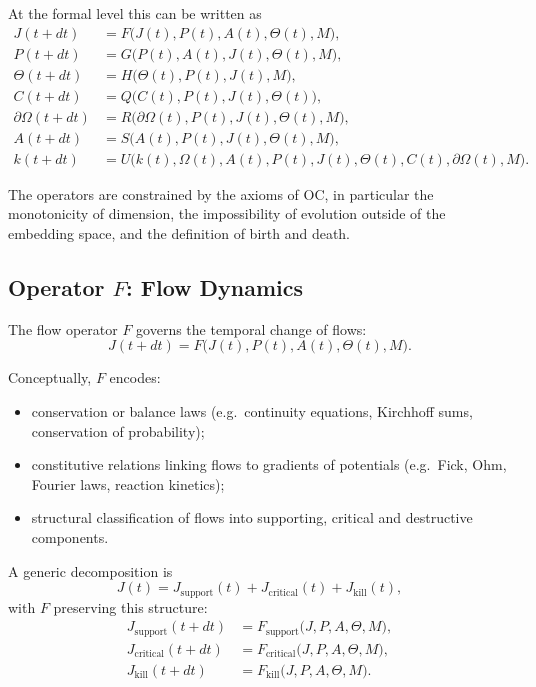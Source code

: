 At the formal level this can be written as
\begin{align*}
  J(t+dt)              &= F\big(J(t), P(t), A(t), \Theta(t), M\big), \\
  P(t+dt)              &= G\big(P(t), A(t), J(t), \Theta(t), M\big), \\
  \Theta(t+dt)         &= H\big(\Theta(t), P(t), J(t), M\big), \\
  C(t+dt)              &= Q\big(C(t), P(t), J(t), \Theta(t)\big), \\
  \partial\Omega(t+dt) &= R\big(\partial\Omega(t), P(t), J(t), \Theta(t), M\big), \\
  A(t+dt)              &= S\big(A(t), P(t), J(t), \Theta(t), M\big), \\
  k(t+dt)              &= U\big(k(t), \Omega(t), A(t), P(t), J(t),
                               \Theta(t), C(t), \partial\Omega(t), M\big).
\end{align*}

The operators are constrained by the axioms of OC, in particular the
monotonicity of dimension, the impossibility of evolution outside of the
embedding space, and the definition of birth and death.

\subsection{Operator \texorpdfstring{\texorpdfstring{$F$}{F}}{F}: Flow Dynamics}

The flow operator \(F\) governs the temporal change of flows:
\[
  J(t+dt) = F\big(J(t), P(t), A(t), \Theta(t), M\big).
\]

Conceptually, \(F\) encodes:
\begin{itemize}
  \item conservation or balance laws (e.g.\ continuity equations, Kirchhoff
        sums, conservation of probability);
  \item constitutive relations linking flows to gradients of potentials
        (e.g.\ Fick, Ohm, Fourier laws, reaction kinetics);
  \item structural classification of flows into supporting, critical and
        destructive components.
\end{itemize}

A generic decomposition is
\[
  J(t) = J_{\mathrm{support}}(t)
       + J_{\mathrm{critical}}(t)
       + J_{\mathrm{kill}}(t),
\]
with \(F\) preserving this structure:
\begin{align*}
  J_{\mathrm{support}}(t+dt)
    &= F_{\mathrm{support}}\big(J, P, A, \Theta, M\big), \\
  J_{\mathrm{critical}}(t+dt)
    &= F_{\mathrm{critical}}\big(J, P, A, \Theta, M\big), \\
  J_{\mathrm{kill}}(t+dt)
    &= F_{\mathrm{kill}}\big(J, P, A, \Theta, M\big).
\end{align*}

